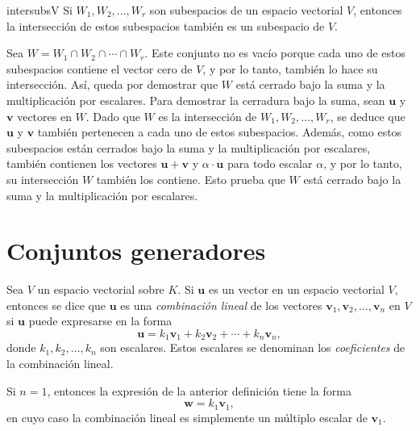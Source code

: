\newpage

\begin{theorem}{}{intersubsV}
    Si $W_1, W_2, \dots, W_r$ son subespacios de un espacio vectorial $V$, entonces la intersección de estos subespacios también es un subespacio de $V$.

    \tcblower
    \demostracion Sea $W = W_1 \cap W_2 \cap \cdots \cap W_r$. Este conjunto no es vacío porque cada uno de estos subespacios contiene el vector cero de $V$, y por lo tanto, también lo hace su intersección. Así, queda por demostrar que $W$ está cerrado bajo la suma y la multiplicación por escalares. Para demostrar la cerradura bajo la suma, sean $\mathbf{u}$ y $\mathbf{v}$ vectores en $W$. Dado que $W$ es la intersección de $W_1, W_2, \dots, W_r$, se deduce que $\mathbf{u}$ y $\mathbf{v}$ también pertenecen a cada uno de estos subespacios. Además, como estos subespacios están cerrados bajo la suma y la multiplicación por escalares, también contienen los vectores $\mathbf{u} + \mathbf{v}$ y $\alpha \cdot \mathbf{u}$ para todo escalar $\alpha$, y por lo tanto, su intersección $W$ también los contiene. Esto prueba que $W$ está cerrado bajo la suma y la multiplicación por escalares.
\end{theorem}

\section{Conjuntos generadores}

\begin{definicion}{}{}
    Sea $V$ un espacio vectorial sobre $K$. Si $\mathbf{u}$ es un vector en un espacio vectorial $V$, entonces se dice que $\mathbf{u}$ es una \emph{combinación lineal} de los vectores $\mathbf{v}_1, \mathbf{v}_2, \dots, \mathbf{v}_n$ en $V$ si $\mathbf{u}$ puede expresarse en la forma
    $$\mathbf{u} = k_1 \mathbf{v}_1 + k_2 \mathbf{v}_2 + \cdots + k_n \mathbf{v}_n,$$
    donde $k_1, k_2, \dots, k_n$ son escalares. Estos escalares se denominan los \emph{coeficientes} de la combinación lineal.
\end{definicion}

Si $n = 1$, entonces la expresión de la anterior definición tiene la forma
$$\mathbf{w} = k_1\mathbf{v}_1,$$
en cuyo caso la combinación lineal es simplemente un múltiplo escalar de $\mathbf{v}_1$.

